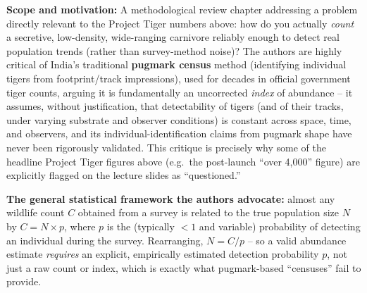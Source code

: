 \documentclass[11pt,a4paper]{article}
\begin{document}
\begin{papbox}[title={Paper Summary: Karanth, K.U.\ \& Nichols, J.D.\ (2010), ``Non-invasive Survey Methods for Assessing Tiger Populations,'' in Tilson, R.\ \& Nyhus, P.J.\ (eds), \textit{Tigers of the World: The Science, Politics, and Conservation of Panthera tigris}, Elsevier}]
\textbf{Scope and motivation:} A methodological review chapter addressing a problem directly relevant to the Project Tiger numbers above: how do you actually \emph{count} a secretive, low-density, wide-ranging carnivore reliably enough to detect real population trends (rather than survey-method noise)? The authors are highly critical of India's traditional \textbf{pugmark census} method (identifying individual tigers from footprint/track impressions), used for decades in official government tiger counts, arguing it is fundamentally an uncorrected \emph{index} of abundance -- it assumes, without justification, that detectability of tigers (and of their tracks, under varying substrate and observer conditions) is constant across space, time, and observers, and its individual-identification claims from pugmark shape have never been rigorously validated. This critique is precisely why some of the headline Project Tiger figures above (e.g.\ the post-launch ``over 4,000'' figure) are explicitly flagged on the lecture slides as ``questioned.''

\textbf{The general statistical framework the authors advocate:} almost any wildlife count $C$ obtained from a survey is related to the true population size $N$ by $C = N \times p$, where $p$ is the (typically $<1$ and variable) probability of detecting an individual during the survey. Rearranging, $N = C/p$ -- so a valid abundance estimate \emph{requires} an explicit, empirically estimated detection probability $p$, not just a raw count or index, which is exactly what pugmark-based ``censuses'' fail to provide.


\end{papbox}
\end{document}

